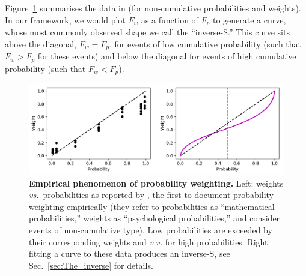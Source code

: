 \documentclass[12pt,letter,timesnewroman]{article}
\newcommand{\flabel}[1]{\label{fig:#1}}
\newcommand{\Fref}[1]{Figure~\ref{fig:#1}}
\newcommand{\secref}[1]{Sec.~\ref{sec:#1}}
\newcommand{\vs}{\textit{vs.}\ }
\newcommand{\vv}{\textit{v.v.}\xspace }
\begin{document}
\Fref{PB1948} summarises the data in \textcite[188]{PrestonBaratta1948} (for non-cumulative probabilities and weights). In our framework, we would plot $F_w$ as a function of $F_p$ to generate a curve, whose most commonly observed shape we call the ``inverse-S.'' This curve sits above the diagonal, $F_w=F_p$, for events of low cumulative probability (such that $F_w>F_p$ for these events) and below the diagonal for events of high cumulative probability (such that $F_w<F_p$).
\begin{figure}[!htb]
\centering
\includegraphics[width=1.0\textwidth]{../../figs/PB48_withfit.pdf}
\caption{\textbf{Empirical phenomenon of probability weighting.} Left: weights \vs probabilities as reported by \textcite{PrestonBaratta1948}, the first to document probability weighting empirically (they refer to probabilities as ``mathematical probabilities,'' weights as ``psychological probabilities,'' and consider events of non-cumulative type). Low probabilities are exceeded by their corresponding weights and \vv for high probabilities. Right: fitting a curve to these data produces an inverse-S, see \secref{The_inverse} for details.}
\flabel{PB1948}
\end{figure}
\end{document}
